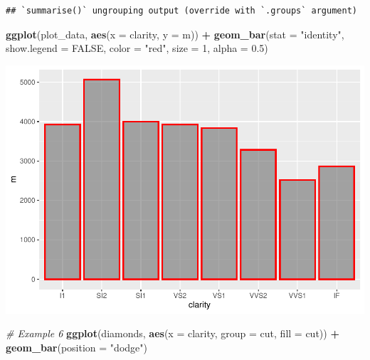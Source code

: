 \documentclass[
]{book}
\newenvironment{Shaded}{\begin{snugshade}}{\end{snugshade}}
\newcommand{\CommentTok}[1]{\textcolor[rgb]{0.56,0.35,0.01}{\textit{#1}}}
\newcommand{\DataTypeTok}[1]{\textcolor[rgb]{0.13,0.29,0.53}{#1}}
\newcommand{\DecValTok}[1]{\textcolor[rgb]{0.00,0.00,0.81}{#1}}
\newcommand{\FloatTok}[1]{\textcolor[rgb]{0.00,0.00,0.81}{#1}}
\newcommand{\KeywordTok}[1]{\textcolor[rgb]{0.13,0.29,0.53}{\textbf{#1}}}
\newcommand{\NormalTok}[1]{#1}
\newcommand{\OperatorTok}[1]{\textcolor[rgb]{0.81,0.36,0.00}{\textbf{#1}}}
\newcommand{\OtherTok}[1]{\textcolor[rgb]{0.56,0.35,0.01}{#1}}
\newcommand{\StringTok}[1]{\textcolor[rgb]{0.31,0.60,0.02}{#1}}
\begin{document}
\begin{verbatim}
## `summarise()` ungrouping output (override with `.groups` argument)
\end{verbatim}

\begin{Shaded}
\begin{Highlighting}[]
\KeywordTok{ggplot}\NormalTok{(plot_data, }\KeywordTok{aes}\NormalTok{(}\DataTypeTok{x =}\NormalTok{ clarity, }\DataTypeTok{y =}\NormalTok{ m)) }\OperatorTok{+}\StringTok{ }\KeywordTok{geom_bar}\NormalTok{(}\DataTypeTok{stat =} \StringTok{"identity"}\NormalTok{,}
    \DataTypeTok{show.legend =} \OtherTok{FALSE}\NormalTok{, }\DataTypeTok{color =} \StringTok{"red"}\NormalTok{, }\DataTypeTok{size =} \DecValTok{1}\NormalTok{, }\DataTypeTok{alpha =} \FloatTok{0.5}\NormalTok{)}
\end{Highlighting}
\end{Shaded}

\includegraphics{_main_files/figure-latex/unnamed-chunk-319-6.pdf}

\begin{Shaded}
\begin{Highlighting}[]
\CommentTok{# Example 6}
\KeywordTok{ggplot}\NormalTok{(diamonds, }\KeywordTok{aes}\NormalTok{(}\DataTypeTok{x =}\NormalTok{ clarity, }\DataTypeTok{group =}\NormalTok{ cut, }\DataTypeTok{fill =}\NormalTok{ cut)) }\OperatorTok{+}
\StringTok{    }\KeywordTok{geom_bar}\NormalTok{(}\DataTypeTok{position =} \StringTok{"dodge"}\NormalTok{)}
\end{Highlighting}
\end{Shaded}
\end{document}
